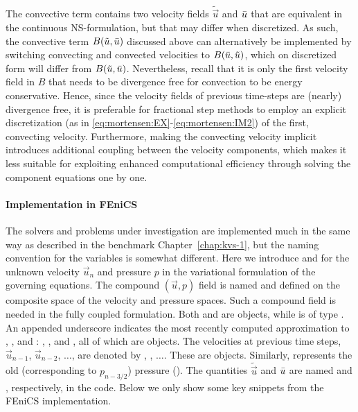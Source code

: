 The convective term contains two velocity fields $\tilde{\vec{u}}$ and
$\Bar{\vec{u}}$ that are equivalent in the continuous
NS-formulation, but that may differ when discretized. As such, the
convective term $B(\tilde{\vec{u}},\Bar{\vec{u}})$ discussed
above can alternatively be implemented by switching convecting and
convected velocities to $B(\Bar{\vec{u}},\tilde{\vec{u}})$, which
on discretized form will differ from
$B(\tilde{\vec{u}},\Bar{\vec{u}})$. Nevertheless, recall that it
is only the first velocity field in $B$ that needs to be divergence
free for convection to be energy conservative. Hence, since the
velocity fields of previous time-steps are (nearly) divergence free,
it is preferable for fractional step methods to employ an explicit
discretization (as in
\eqref{eq:mortensen:EX}-\eqref{eq:mortensen:IM2}) of the first,
convecting velocity. Furthermore, making the convecting velocity
implicit introduces additional coupling between the velocity
components, which makes it less suitable for exploiting enhanced
computational efficiency through solving the component equations one
by one.

\paragraph{Implementation in FEniCS}
\label{sec:mortensen:impl_fenics}

The solvers and problems under investigation are implemented much in
the same way as described in the benchmark Chapter~\ref{chap:kvs-1},
but the naming convention for the variables is somewhat
different. Here we introduce  and  for the unknown
velocity $\vec{u}_n$ and pressure $p$ in the variational formulation
of the governing equations. The compound $(\vec{u},p)$ field is named
 and defined on the composite space of the velocity and
pressure spaces. Such a compound field is needed in the fully coupled
formulation.  Both  and  are 
objects, while  is of type .  An appended
underscore indicates the most recently computed approximation to
, , and : , , and ,
all of which are  objects. The velocities at previous
time steps, $\vec{u}_{n-1}$, $\vec{u}_{n-2}$, $\ldots$, are denoted by
, , $\ldots$. These are 
objects. Similarly,  represents the old (corresponding to
$p_{n-3/2}$) pressure (). The quantities
$\tilde{\vec{u}}$ and $\Bar{\vec{u}}$ are named 
and , respectively, in the code. Below we only show some
key snippets from the FEniCS implementation.

